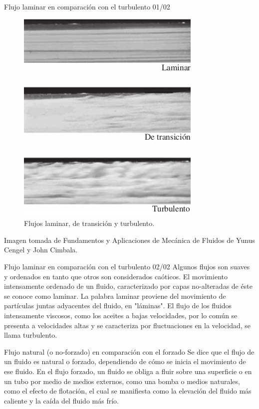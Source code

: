 	
\begin{frame}{Flujo laminar en comparación con el turbulento 01/02}
\justifying
\begin{figure}[H]
\centering
\includegraphics[scale=0.25]{Section_Files/imagenes/sec01_0101_Fig01-20.png}
\caption{Flujos laminar, de transición y turbulento.}
\label{fig: Figura1-20}
\end{figure}
Imagen tomada de Fundamentos y Aplicaciones de Mecánica de Fluidos de Yunus Cengel y John Cimbala.
\end{frame}

\begin{frame}{Flujo laminar en comparación con el turbulento 02/02}
\justifying
Algunos flujos son suaves y ordenados en tanto que otros son considerados caóticos. El movimiento intensamente ordenado de un fluido, caracterizado por capas no-alteradas de éste se conoce como laminar. La palabra laminar proviene del movimiento de partículas juntas adyacentes del fluido, en "láminas". El flujo de los fluidos intensamente viscosos, como los aceites a bajas velocidades, por lo común se presenta a velocidades altas y se caracteriza por fluctuaciones en la velocidad, se llama turbulento.
\end{frame}

\begin{frame}{Flujo natural (o no-forzado) en comparación con el forzado}
\justifying
Se dice que el flujo de un fluido es natural o forzado, dependiendo de cómo se inicia el movimiento de ese fluido. En el flujo forzado, un fluido se obliga a fluir sobre una superficie o en un tubo por medio de medios externos, como una bomba o medios naturales, como el efecto de flotación, el cual se manifiesta como la elevación del fluido más caliente y la caída del fluido más frío.
\end{frame}
	
